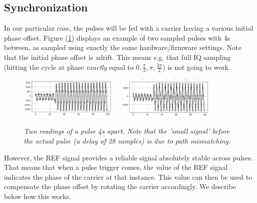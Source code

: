 \documentclass[12pt]{amsart}
\begin{document}
\subsection{Synchronization}




In our particular case, the pulses will be fed with a carrier having a various initial phase offset.
Figure (\ref{fig:pulsex}) displays an example of two sampled pulses with 4s between, 
as sampled using exactly the same hardware/firmware settings. Note that the initial phase offset is adrift.
This means e.g. that full IQ sampling (hitting the cycle at phase {\em exactly} equal to $0,\frac{\pi}{2}, \pi, \frac{3\pi}{2}$) is not going to work.



\begin{figure}[htbp] %
   \centering
   \includegraphics[width=2in]{im/pulse1.png} 
   \includegraphics[width=2in]{im/pulse2.png} 
   \caption{\em Two readings of a pulse 4s apart.
   	Note that the 'small signal' before the actual pulse (a delay of 28 samples) is due to path mismatching.}
   \label{fig:pulsex}
\end{figure}


However, the REF signal provides a reliable signal absolutely stable across pulses.
That means that when a pulse trigger comes, the value of the REF signal indicates the phase of the carrier at that instance.
This value can then be used to compensate the phase offset by rotating the carrier accordingly.
We describe below how this works.
\end{document}
